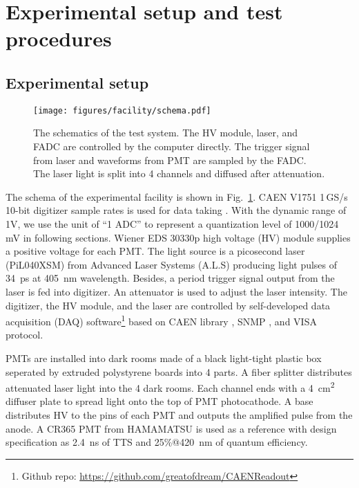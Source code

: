 \section{Experimental setup and test procedures}
\label{SetUp}
\subsection{Experimental setup}
\label{sec:setup}
\begin{figure}[!htbp]
    \centering
    \texttt{[image: figures/facility/schema.pdf]}
    \caption{The schematics of the test system. The HV module, laser, and FADC are controlled by the computer directly. The trigger signal from laser and waveforms from PMT are sampled by the FADC. The laser light is split into 4 channels and diffused after attenuation.}
    \label{fig:facility}
\end{figure}

The schema of the experimental facility is shown in Fig.~\ref{fig:facility}. CAEN V1751 1\,GS/s 10-bit digitizer sample rates is used for data taking \cite{CAENV1751}. With the dynamic range of 1V, we use the unit of ``1 ADC''  to represent a quantization level of 1000/1024\,mV \cite{JUNOPrototype} in following sections. Wiener EDS 30330p high voltage (HV) module \cite{WIENERHV} supplies a positive voltage for each PMT. The light source is a picosecond laser (PiL040XSM) from Advanced Laser Systems (A.L.S) \cite{NTKLaser} producing light pulses of \SI{34}{ps} at \SI{405}{nm} wavelength. Besides, a period trigger signal output from the laser is fed into digitizer. An attenuator is used to adjust the laser intensity. The digitizer, the HV module, and the laser are controlled by self-developed data acquisition (DAQ) software\footnote{Github repo: \url{https://github.com/greatofdream/CAENReadout}} based on CAEN library \cite{CAENLIB}, SNMP \cite{SNMP}, and VISA \cite{VISA} protocol.

PMTs are installed into dark rooms made of a black light-tight plastic box seperated by extruded polystyrene boards into 4 parts. A fiber splitter distributes attenuated laser light into the 4 dark rooms. Each channel ends with a \SI{4}{cm\tothe{2}} diffuser plate to spread light onto the top of PMT photocathode.
A base distributes HV to the pins of each PMT and outputs the amplified pulse from the anode. A CR365 PMT \cite{BJBS} from HAMAMATSU is used as a reference with design specification as \SI{2.4}{ns} of TTS and 25\%@\SI{420}{nm} of quantum efficiency.


